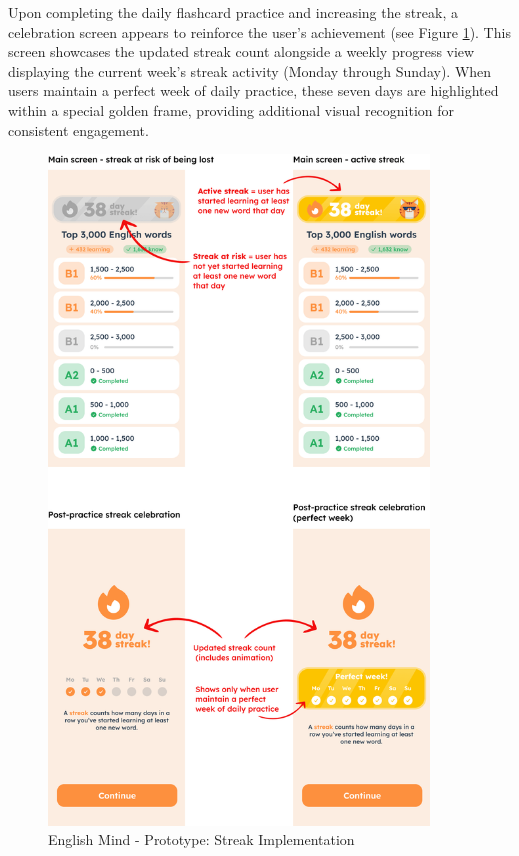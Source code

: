 Upon completing the daily flashcard practice and increasing the streak, a celebration screen appears to reinforce the user's achievement (see Figure \ref{fig:em-prototype-streak}). This screen showcases the updated streak count alongside a weekly progress view displaying the current week's streak activity (Monday through Sunday). When users maintain a perfect week of daily practice, these seven days are highlighted within a special golden frame, providing additional visual recognition for consistent engagement.

\newpage

\begin{figure}[!h]
    \includegraphics[width=0.9\textwidth]{src/figures/em-prototype-streak.png}
    \caption{English Mind - Prototype: Streak Implementation}
    \label{fig:em-prototype-streak}
\end{figure}


